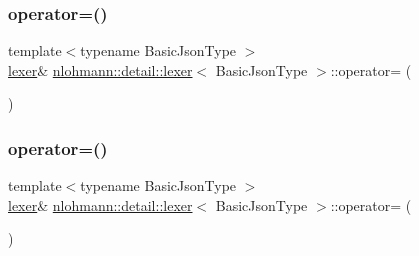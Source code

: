 \subsubsection{\texorpdfstring{operator=()}{operator=()}\hspace{0.1cm}{\footnotesize\ttfamily [1/2]}}
{\footnotesize\ttfamily template$<$typename Basic\+Json\+Type $>$ \\
\mbox{\hyperlink{classnlohmann_1_1detail_1_1lexer}{lexer}}\& \mbox{\hyperlink{classnlohmann_1_1detail_1_1lexer}{nlohmann\+::detail\+::lexer}}$<$ Basic\+Json\+Type $>$\+::operator= (\begin{DoxyParamCaption}\item[{\mbox{\hyperlink{classnlohmann_1_1detail_1_1lexer}{lexer}}$<$ Basic\+Json\+Type $>$ \&}]{ }\end{DoxyParamCaption})\hspace{0.3cm}{\ttfamily [delete]}}

\mbox{\label{classnlohmann_1_1detail_1_1lexer_af8ab91a774484fa220ba073421c8f452}} 
\subsubsection{\texorpdfstring{operator=()}{operator=()}\hspace{0.1cm}{\footnotesize\ttfamily [2/2]}}
{\footnotesize\ttfamily template$<$typename Basic\+Json\+Type $>$ \\
\mbox{\hyperlink{classnlohmann_1_1detail_1_1lexer}{lexer}}\& \mbox{\hyperlink{classnlohmann_1_1detail_1_1lexer}{nlohmann\+::detail\+::lexer}}$<$ Basic\+Json\+Type $>$\+::operator= (\begin{DoxyParamCaption}\item[{\mbox{\hyperlink{classnlohmann_1_1detail_1_1lexer}{lexer}}$<$ Basic\+Json\+Type $>$ \&\&}]{ }\end{DoxyParamCaption})\hspace{0.3cm}{\ttfamily [delete]}}

\mbox{\label{classnlohmann_1_1detail_1_1lexer_acba34bc18af19f93186e682d02c3942d}} 

